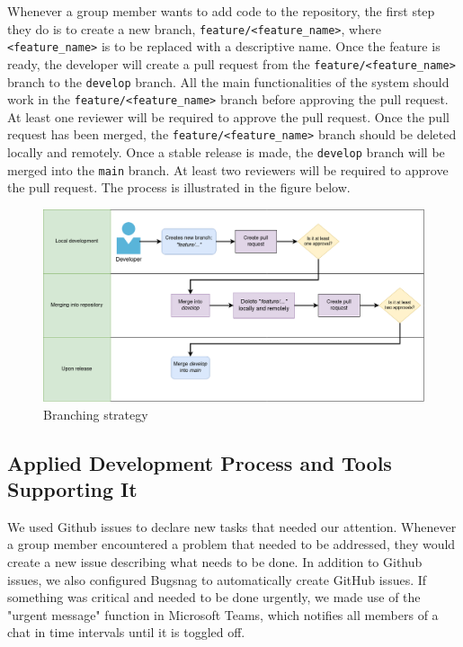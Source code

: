 Whenever a group member wants to add code to the repository, the first step they do is to create a new branch, \texttt{feature/<feature\_name>}, where \texttt{<feature\_name>} is to be replaced with a descriptive name. Once the feature is ready, the developer will create a pull request from the \texttt{feature/<feature\_name>} branch to the \texttt{develop} branch. All the main functionalities of the system should work in the \texttt{feature/<feature\_name>} branch before approving the pull request. At least one reviewer will be required to approve the pull request. Once the pull request has been merged, the \texttt{feature/<feature\_name>} branch should be deleted locally and remotely. Once a stable release is made, the \texttt{develop} branch will be merged into the \texttt{main} branch. At least two reviewers will be required to approve the pull request. The process is illustrated in the figure below.
\begin{figure}[ht]
		\centering
		\includegraphics[width=\textwidth]{images/branching.drawio.png}
		\caption{Branching strategy}
		\label{fig:example}
\end{figure}


\subsection{Applied Development Process and Tools Supporting It}
We used Github issues to declare new tasks that needed our attention. Whenever a group member encountered a problem that needed to be addressed, they would create a new issue describing what needs to be done. In addition to Github issues, we also configured Bugsnag to automatically create GitHub issues. If something was critical and needed to be done urgently, we made use of the "urgent message" function in Microsoft Teams, which notifies all members of a chat in time intervals until it is toggled off.


